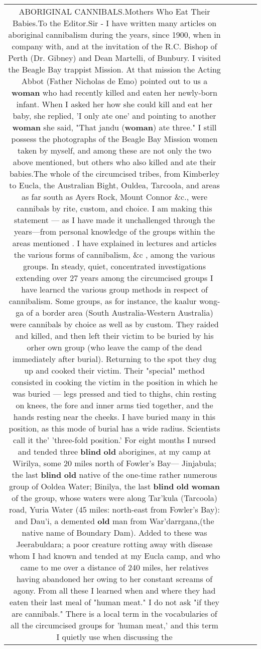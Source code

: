 \documentclass[11pt]{article}
\newlength\mylength
\begin{document}
\begin{center}
\begin{longtable}{|C{.65\mylength}|C{.30\mylength}|C{.12\mylength}|C{.12\mylength}|C{.12\mylength}|}
  \small ABORIGINAL CANNIBALS.Mothers Who Eat Their Babies.To the Editor.Sir - I have written many articles on aboriginal cannibalism during the years, since 1900, when in company with, and at the invitation of the R.C. Bishop of Perth (Dr. Gibney) and Dean Martelli, of Bunbury. I visited the Beagle Bay trappist Mission. At that mission the Acting Abbot (Father Nicholas de Emo) pointed out to us a \textbf{woman} who had recently killed and eaten her newly-born infant. When I asked her how she could kill and eat her baby, she replied, 'I only ate one' and pointing to another \textbf{woman} she said, "That jandu (\textbf{woman}) ate three." I still possess the photographs of the Beagle Bay Mission women taken by myself, and among these are not only the two above mentioned, but others who also killed and ate their babies.The whole of the circumcised tribes, from Kimberley to Eucla, the Australian Bight, Ouldea, Tarcoola, and areas as far south as Ayers Rock, Mount Connor \&c., were cannibals by rite, custom, and choice. I am making this statement — as I have made it unchallenged through the years—from personal knowledge of the groups within the areas mentioned . I have explained in lectures and articles the various forms of cannibalism, \&c , among the various groups. In steady, quiet, concentrated investigations extending over 27 years among the circumcised groups I have learncd the various group methods in respect of cannibalism. Some groups, as for instance, the kaalur wong-ga of a border area (South Australia-Western Australia) were cannibals by choice as well as by custom. They raided and killed, and then left their victim to be buried by his orher own group (who leave the camp of the dead immediately after burial). Returning to the spot they dug up and cooked their victim. Their "special" method consisted in cooking the victim in the position in which he was buried — legs pressed and tied to thighs, chin resting on knees, the fore and inner arms tied together, and the hands resting near the cheeks. I have buried many in this position, as this mode of burial has a wide radius. Scientists call it the' 'three-fold position.' For eight months I nursed and tended three \textbf{blind} \textbf{old} aborigines, at my camp at Wirilya, some 20 miles north of Fowler's Bay— Jinjabula; the last \textbf{blind} \textbf{old} native of the one-time rather numerous group of Ooldea Water; Binilya, the last \textbf{blind} \textbf{old} \textbf{woman} of the group, whose waters were along Tar'kula (Tarcoola) road, Yuria Water (45 miles: north-east from Fowler's Bay): and Dau'i, a demented \textbf{old} man from War'darrgana,(the native name of Boundary Dam). Added to these was Jeerabuldara; a poor creature rotting away with disease whom I had known and tended at my Eucla camp, and who came to me over a distance of 240 miles, her relatives having abandoned her owing to her constant screams of agony. From all these I learned when and where they had eaten their last meal of "human meat." I do not ask "if they are cannibals." There is a local term in the vocabularies of all the circumcised groups for 'human meat,' and this term I quietly use when discussing the 
\end{longtable}
\end{center}
\end{document}

